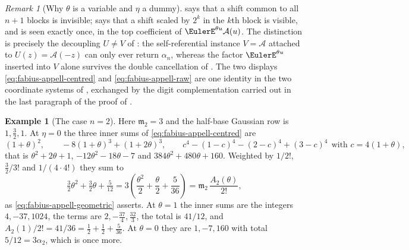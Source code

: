 \documentclass[11pt,a4paper,oneside,openany]{book}
\theoremstyle{definition}
\newtheorem{example}[example]{Example}
\theoremstyle{remark}
\newtheorem{remark}[remark]{Remark}
\begin{document}
\begin{remark}[Why $\theta$ is a variable and $\eta$ a dummy]
 says that a shift common to all $n+1$ blocks is
invisible;  says that a shift scaled by
$2^k$ in the $k$th block is visible, and is seen exactly once, in the top
coefficient of $\EulerE^{\theta u}\mathcal A(u)$.  The distinction is precisely the
decoupling $U\ne V$ of : the
self-referential instance $V=\mathcal A$ attached to $U(z)=\mathcal A(-z)$ can
only ever return $\alpha_n$, whereas the factor $\EulerE^{\theta u}$ inserted into $V$
alone survives the double cancellation of .  The
two displays \eqref{eq:fabius-appell-centred} and \eqref{eq:fabius-appell-raw}
are one identity in the two coordinate systems of
, exchanged by the digit complementation carried
out in the last paragraph of the proof of .
\end{remark}

\begin{example}[The case $n=2$]\label{ex:fabius-appell-small}
Here $\mathfrak m_2=3$ and the half-base Gaussian row is $1,\tfrac32,1$.  At
$\eta=0$ the three inner sums of \eqref{eq:fabius-appell-centred} are
\[
 (1+\theta)^2,\qquad
 -8(1+\theta)^3+(1+2\theta)^3,\qquad
 c^4-(1-c)^4-(2-c)^4+(3-c)^4\ \ \text{with } c=4(1+\theta),
\]
that is $\theta^2+2\theta+1$, $-12\theta^2-18\theta-7$ and
$384\theta^2+480\theta+160$.  Weighted by $1/2!$, $\tfrac32/3!$ and
$1/(4\cdot4!)$ they sum to
\[
 \tfrac32\theta^2+\tfrac32\theta+\tfrac5{12}
 =3\left(\frac{\theta^2}2+\frac\theta2+\frac5{36}\right)
 =\mathfrak m_2\,\frac{A_2(\theta)}{2!},
\]
as \eqref{eq:fabius-appell-geometric} asserts.  At $\theta=1$ the inner sums are
the integers $4,-37,1024$, the terms are $2,-\tfrac{37}4,\tfrac{32}3$, the total
is $41/12$, and $A_2(1)/2!=41/36=\tfrac12+\tfrac12+\tfrac5{36}$.  At $\theta=0$
they are $1,-7,160$ with total $5/12=3\alpha_2$, which is
 once more.
\end{example}
\end{document}
